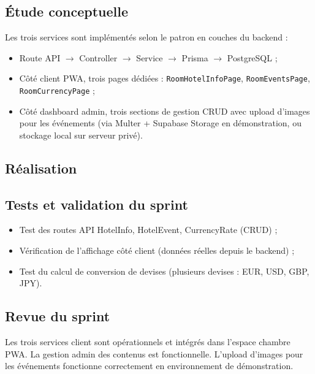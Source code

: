 \subsection{Étude conceptuelle}

Les trois services sont implémentés selon le patron en couches du backend :
\begin{itemize}
  \item Route API $\rightarrow$ Controller $\rightarrow$ Service $\rightarrow$ Prisma $\rightarrow$ PostgreSQL ;
  \item Côté client PWA, trois pages dédiées : \texttt{RoomHotelInfoPage}, \texttt{RoomEventsPage}, \texttt{RoomCurrencyPage} ;
  \item Côté dashboard admin, trois sections de gestion CRUD avec upload d'images pour les événements (via Multer + Supabase Storage en démonstration, ou stockage local sur serveur privé).
\end{itemize}

\subsection{Réalisation}


\subsection{Tests et validation du sprint}

\begin{itemize}
  \item Test des routes API HotelInfo, HotelEvent, CurrencyRate (CRUD) ;
  \item Vérification de l'affichage côté client (données réelles depuis le backend) ;
  \item Test du calcul de conversion de devises (plusieurs devises : EUR, USD, GBP, JPY).
\end{itemize}

\subsection{Revue du sprint}

Les trois services client sont opérationnels et intégrés dans l'espace chambre PWA. La gestion admin des contenus est fonctionnelle. L'upload d'images pour les événements fonctionne correctement en environnement de démonstration.

